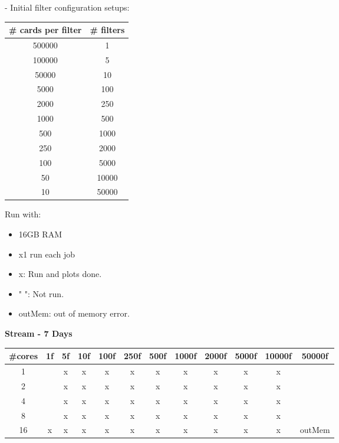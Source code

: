 - Initial filter configuration setups:
\begin{table}[H]
\renewcommand{\arraystretch}{1.5} %
\centering
\begin{tabular}{|c|c|}
\hline
\# cards per filter & \# filters \\ \hline
500000   &   1     \\ \hline
100000   &   5     \\ \hline
50000 &   10     \\ \hline
5000  &   100     \\ \hline
2000 &   250    \\ \hline
1000  &   500    \\ \hline
500  &   1000    \\ \hline
250  &   2000    \\ \hline
100  &   5000    \\ \hline
50  &   10000    \\ \hline
10  &   50000    \\ \hline
\end{tabular}
\end{table}

Run with:
\begin{itemize}
    \item 16GB RAM
    \item x1 run each job
\end{itemize}

\begin{itemize}
    \item x: Run and plots done.
    \item " ": Not run.
    \item outMem: out of memory error.
\end{itemize}

\textbf{Stream - 7 Days}
\begin{table}[H]
  \begin{tabular}{|c|c|c|c|c|c|c|c|c|c|c|c|}
  \hline
  \#cores & 1f & 5f & 10f & 100f & 250f & 500f & 1000f & 2000f & 5000f & 10000f & 50000f \\ \hline
  1       &   & x & x & x & x & x & x & x & x & x &        \\ \hline
  2       &   & x & x & x & x & x & x & x & x & x &        \\ \hline
  4       &   & x & x & x & x & x & x & x & x & x &        \\ \hline
  8       &   & x & x & x & x & x & x & x & x & x &        \\ \hline
  16      & x & x & x & x & x & x & x & x & x & x & outMem \\ \hline
  \end{tabular}
\end{table}

